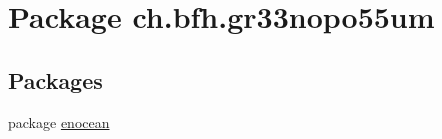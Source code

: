 \hypertarget{namespacech_1_1bfh_1_1gr33nopo55um}{}\section{Package ch.\+bfh.\+gr33nopo55um}
\label{namespacech_1_1bfh_1_1gr33nopo55um}
\subsection*{Packages}
\begin{DoxyCompactItemize}
\item 
package \hyperlink{namespacech_1_1bfh_1_1gr33nopo55um_1_1enocean}{enocean}
\end{DoxyCompactItemize}
